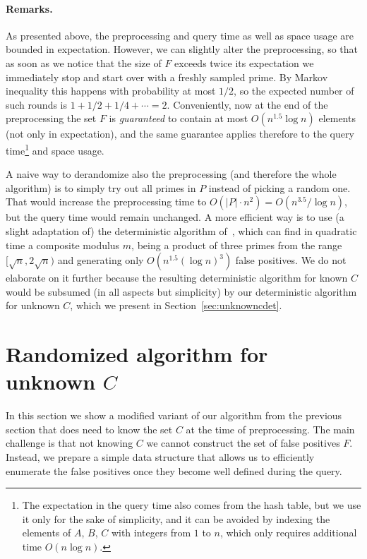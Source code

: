\documentclass{theoretics}
\begin{document}
\paragraph{Remarks.}
As presented above, the preprocessing and query time as well as space usage are bounded in expectation. However, we can slightly alter the preprocessing, so that as soon as we notice that the size of $F$ exceeds twice its expectation we immediately stop and start over with a freshly sampled prime. By Markov inequality this happens with probability at most $1/2$, so the expected number of such rounds is $1+1/2+1/4+\cdots=2$. Conveniently, now at the end of the preprocessing the set $F$ is \emph{guaranteed} to contain at most $O(n^{1.5} \log n)$ elements (not only in expectation), and the same guarantee applies therefore to the query time\footnote{The expectation in the query time also comes from the hash table, but we use it only for the sake of simplicity, and it can be avoided by indexing the elements of $A$, $B$, $C$ with integers from $1$ to $n$, which only requires additional time $O(n \log n)$.} and space usage.

A naive way to derandomize also the preprocessing (and therefore the whole algorithm) is to simply try out all primes in $P$ instead of picking a random one. That would increase the preprocessing time to $O(|P| \cdot n^2) = O(n^{3.5}/\log n)$, but the query time would remain unchanged.
A more efficient way is to use (a slight adaptation of) the deterministic algorithm of~\cite[Lemma~11]{FischerK024}, which can find in quadratic time a composite modulus $m$, being a product of three primes from the range $[\sqrt{n}, 2\sqrt{n})$ and generating only $O(n^{1.5} (\log n)^3)$ false positives. We do not elaborate on it further because the resulting deterministic algorithm for known $C$ would be subsumed (in all aspects but simplicity) by our deterministic algorithm for unknown $C$, which we present in Section~\ref{sec:unknowncdet}.    
    
\section{Randomized algorithm for unknown \texorpdfstring{$C$}{C}}
\label{sec:unknowncrnd}

In this section we show a modified variant of our algorithm from the previous section that does need to know the set $C$ at the time of preprocessing. The main challenge is that not knowing $C$ we cannot construct the set of false positives $F$. Instead, we prepare a simple data structure that allows us to efficiently enumerate the false positives once they become well defined during the query.
\end{document}
